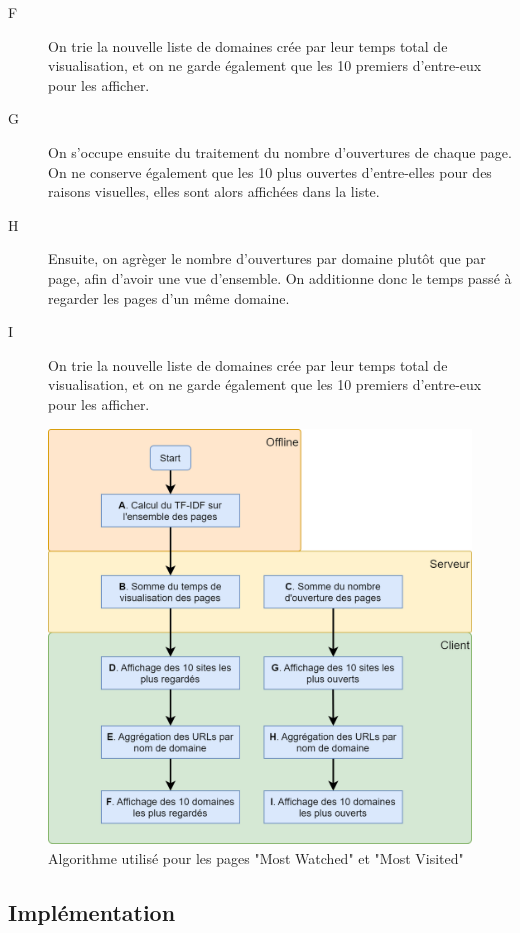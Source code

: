 \begin{description}
				\item[F] On trie la nouvelle liste de domaines crée par leur temps total de visualisation, et on ne garde également que les 10 premiers d'entre-eux pour les afficher.

				\item[G] On s'occupe ensuite du traitement du nombre d'ouvertures de chaque page. On ne conserve également que les 10 plus ouvertes d'entre-elles pour des raisons visuelles, elles sont alors affichées dans la liste.

				\item[H] Ensuite, on agrèger le nombre d'ouvertures par domaine plutôt que par page, afin d'avoir une vue d'ensemble. On additionne donc le temps passé à regarder les pages d'un même domaine.

				\item[I] On trie la nouvelle liste de domaines crée par leur temps total de visualisation, et on ne garde également que les 10 premiers d'entre-eux pour les afficher.
			\end{description}

			\begin{figure}[!h]
				\centering
				\includegraphics[height=0.8\textwidth]{images/design/pages/mostwatched_algo}
				\caption{Algorithme utilisé pour les pages "Most Watched" et "Most Visited"}
				\label{mostwatched_algo}
			\end{figure}

	\subsection{Implémentation}

